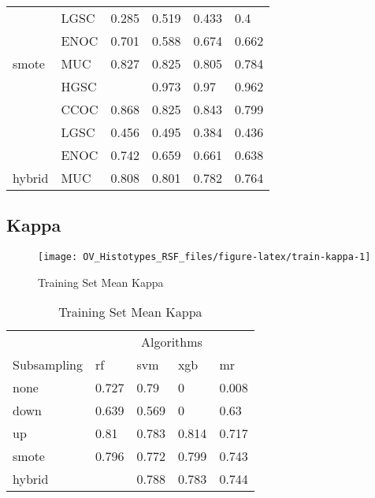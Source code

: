 \documentclass[
]{report}
\begin{document}
\begin{table}
\begin{tabular}[t]{l|l|l|l|l|l}
\cline{2-6}
 & LGSC & 0.285 & 0.519 & 0.433 & 0.4\\
\cline{2-6}
 & ENOC & 0.701 & 0.588 & 0.674 & 0.662\\
\cline{2-6}
\multirow{-5}{*}{\raggedright\arraybackslash smote} & MUC & 0.827 & 0.825 & 0.805 & 0.784\\
\cline{1-6}
 & HGSC & \cellcolor[HTML]{90ee90}{0.977} & 0.973 & 0.97 & 0.962\\
\cline{2-6}
 & CCOC & 0.868 & 0.825 & 0.843 & 0.799\\
\cline{2-6}
 & LGSC & 0.456 & 0.495 & 0.384 & 0.436\\
\cline{2-6}
 & ENOC & 0.742 & 0.659 & 0.661 & 0.638\\
\cline{2-6}
\multirow{-5}{*}{\raggedright\arraybackslash hybrid} & MUC & 0.808 & 0.801 & 0.782 & 0.764\\
\hline
\end{tabular}
\end{table}

\hypertarget{kappa-1}{%
\subsection{Kappa}\label{kappa-1}}

\begin{figure}[H]

{\centering \texttt{[image: OV\_Histotypes\_RSF\_files/figure-latex/train-kappa-1]} 

}

\caption{Training Set Mean Kappa}\label{fig:train-kappa}
\end{figure}

\begin{table}

\caption{\label{tab:train-kappa-table}Training Set Mean Kappa}
\centering
\begin{tabular}[t]{l|l|l|l|l}
\hline
\multicolumn{1}{c|}{ } & \multicolumn{4}{c}{Algorithms} \\
\cline{2-5}
Subsampling & rf & svm & xgb & mr\\
\hline
none & 0.727 & 0.79 & 0 & 0.008\\
\hline
down & 0.639 & 0.569 & 0 & 0.63\\
\hline
up & 0.81 & 0.783 & 0.814 & 0.717\\
\hline
smote & 0.796 & 0.772 & 0.799 & 0.743\\
\hline
hybrid & \cellcolor[HTML]{90ee90}{0.819} & 0.788 & 0.783 & 0.744\\
\hline
\end{tabular}
\end{table}
\end{document}
